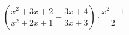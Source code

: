 \begin{ex}[type=expression]
	\begin{condition}
		\(\left( \dfrac{x^2+3x+2}{x^2+2x+1}-\dfrac{3x+4}{3x+3} \right)\cdot\dfrac{x^2-1}{2}\)
	\end{condition}
\end{ex}